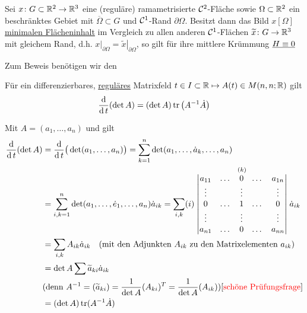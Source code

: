 \begin{satz}\label{satz261}
 Sei \(x \colon G \subset \mathbb{R}^2 \to \mathbb{R}^3\) eine (reguläre) ramametrisierte \(\mathcal{C}^2\)-Fläche sowie \(\Omega \subset \mathbb{R}^2\) ein beschränktes Gebiet mit \(\overline \Omega \subset G\) und \(\mathcal{C}^1\)-Rand \(\partial \Omega\). Besitzt dann das Bild \(x[\Omega]\) \uline{minimalen Flächeninhalt} im Vergleich zu allen anderen \(\mathcal{C}^1\)-Flächen \(\widetilde x \colon G \to \mathbb{R}^3\) mit gleichem Rand, d.h. \(\left. x \right|_{\partial \Omega} = \left. \widetilde x \right|_{\partial \Omega}\), so gilt für ihre mittlere Krümmung \(\uline{H \equiv 0}\)
\end{satz}

Zum Beweis benötigen wir den

\begin{hilfssatz}
 Für ein differenzierbares, \uline{reguläres} Matrixfeld \(t \in I \subset \mathbb{R} \mapsto A(t) \in M(n,n;\mathbb{R})\) gilt
 \[
  \frac{\operatorname{d}}{\operatorname{d} t}(\det A) = (\det A) \operatorname{tr}\left(A^{-1} \dot A\right)
 \]
\end{hilfssatz}

\begin{beweis}
 Mit \(A = (a_1, \dots, a_n)\) und  gilt
 \begin{align*}
  \frac{\operatorname{d}}{\operatorname{d} t} (\det A) &= \frac{\operatorname{d}}{\operatorname{d} t} \big( \det(a_1, \dots, a_n)\big) = \sum_{k = 1}^n \det(a_1, \dots, \dot a_k, \dots, a_n) \\
  &=\sum_{i,k = 1}^n \det (a_1, \dots, \dot e_1, \dots, a_n) \dot a_{ik} = \sum_{i,k} (i)\stackrel{(k)}{\left|\begin{matrix}
  				  a_{11} & \dots & 0      & \dots & a_{1n} \\
  				  \vdots & 		 & \vdots &       &\vdots  \\
  				  0      & \dots & 1      & \dots & 0      \\
 	       		  \vdots & 		 & \vdots &       &\vdots  \\
 	       		  a_{n1} & \dots & 0      & \dots & a_{nn}
  				 \end{matrix}\right|} \dot a_{ik} \\
  &= \sum_{i,k} A_{ik} \dot a_{ik} \quad (\text{mit den Adjunkten } A_{ik} \text{ zu den Matrixelementen }a_{ik}) \\
  &= \det A \sum \widetilde a_{ki} \dot a_{ik} \\
  &(\text{denn } A^{-1} = (\widetilde a_{ki}) = \frac1{\det A} (A_{ki})^T = \frac{1}{\det A} (A_{ik}))\text{[{\color{red}{schöne Prüfungsfrage}}]} \\
  &=(\det A) \operatorname{tr}(A^{-1} \dot A)
 \end{align*}
\end{beweis}

